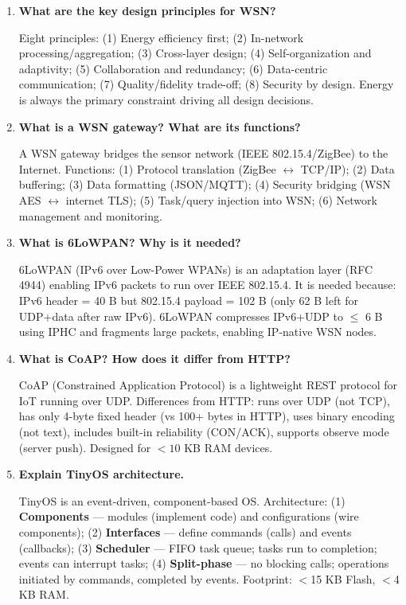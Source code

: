 \documentclass[12pt,a4paper]{article}
\newcommand{\Q}[1]{\textbf{#1}\par\noindent\ignorespaces}
\begin{document}
\begin{tcolorbox}[exambox, title={\textbf{Frequently Asked / Viva Questions}}]
\begin{enumerate}[topsep=0pt, label=\textbf{Q\arabic*.}, itemsep=5pt]
  \item \Q{What are the key design principles for WSN?}
  Eight principles: (1) Energy efficiency first; (2) In-network processing/aggregation; (3) Cross-layer design; (4) Self-organization and adaptivity; (5) Collaboration and redundancy; (6) Data-centric communication; (7) Quality/fidelity trade-off; (8) Security by design. Energy is always the primary constraint driving all design decisions.

  \item \Q{What is a WSN gateway? What are its functions?}
  A WSN gateway bridges the sensor network (IEEE 802.15.4/ZigBee) to the Internet. Functions: (1) Protocol translation (ZigBee $\leftrightarrow$ TCP/IP); (2) Data buffering; (3) Data formatting (JSON/MQTT); (4) Security bridging (WSN AES $\leftrightarrow$ internet TLS); (5) Task/query injection into WSN; (6) Network management and monitoring.

  \item \Q{What is 6LoWPAN? Why is it needed?}
  6LoWPAN (IPv6 over Low-Power WPANs) is an adaptation layer (RFC 4944) enabling IPv6 packets to run over IEEE 802.15.4. It is needed because: IPv6 header = 40 B but 802.15.4 payload = 102 B (only 62 B left for UDP+data after raw IPv6). 6LoWPAN compresses IPv6+UDP to $\leq$ 6 B using IPHC and fragments large packets, enabling IP-native WSN nodes.

  \item \Q{What is CoAP? How does it differ from HTTP?}
  CoAP (Constrained Application Protocol) is a lightweight REST protocol for IoT running over UDP. Differences from HTTP: runs over UDP (not TCP), has only 4-byte fixed header (vs 100+ bytes in HTTP), uses binary encoding (not text), includes built-in reliability (CON/ACK), supports observe mode (server push). Designed for $< 10$ KB RAM devices.

  \item \Q{Explain TinyOS architecture.}
  TinyOS is an event-driven, component-based OS. Architecture: (1) \textbf{Components} --- modules (implement code) and configurations (wire components); (2) \textbf{Interfaces} --- define commands (calls) and events (callbacks); (3) \textbf{Scheduler} --- FIFO task queue; tasks run to completion; events can interrupt tasks; (4) \textbf{Split-phase} --- no blocking calls; operations initiated by commands, completed by events. Footprint: $<$15 KB Flash, $<$4 KB RAM.


\end{enumerate}
\end{tcolorbox}
\end{document}
